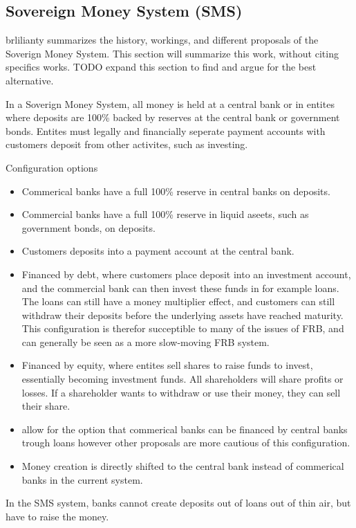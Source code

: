 \subsection{Sovereign Money System (SMS)}
\textcite{Stellinga2021} brlilianty summarizes the history, workings, and different proposals of the Soverign Money System. This section will summarize this work, without citing specifics works. TODO expand this section to find and argue for the best alternative.

In a Soverign Money System, all money is held at a central bank or in entites where deposits are 100\% backed by reserves at the central bank or government bonds. Entites must legally and financially seperate payment accounts with customers deposit from other activites, such as investing. 

Configuration options 
\begin{itemize}
    \item Commerical banks have a full 100\% reserve in central banks on deposits.
    \item Commercial banks have a full 100\% reserve in liquid aseets, such as government bonds, on deposits.
    \item Customers deposits into a payment account at the central bank.
    \item Financed by debt, where customers place deposit into an investment account, and the commercial bank can then invest these funds in for example loans. The loans can still have a money multiplier effect, and customers can still withdraw their deposits before the underlying assets have reached maturity. This configuration is therefor succeptible to many of the issues of FRB, and can generally be seen as a more slow-moving FRB system.
    \item Financed by equity, where entites sell shares to raise funds to invest, essentially becoming investment funds. All shareholders will share profits or losses. If a shareholder wants to withdraw or use their money, they can sell their share. 
    \item \textcite{chicagorevisited} allow for the option that commerical banks can be financed by central banks trough loans however other proposals are more cautious of this configuration.   
    \item Money creation is directly shifted to the central bank instead of commerical banks in the current system. 
\end{itemize}

In the SMS system, banks cannot create deposits out of loans out of thin air, but have to raise the money. 

